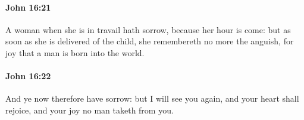 		\paragraph{John 16:21} %
			\label{JOHN-16-21}

			A woman when she is in travail hath sorrow, because her hour is come: but as soon as she is delivered of the child, she remembereth no more the anguish, for joy that a man is born into the world.

			\begin{framed}
				\scriptsize
				\begin{compactdesc}
					\item[SBLG] 
				\end{compactdesc}
			\end{framed}

		\paragraph{John 16:22} %
			\label{JOHN-16-22}

			And ye now therefore have sorrow: but I will see you again, and your heart shall rejoice, and your joy no man taketh from you.

